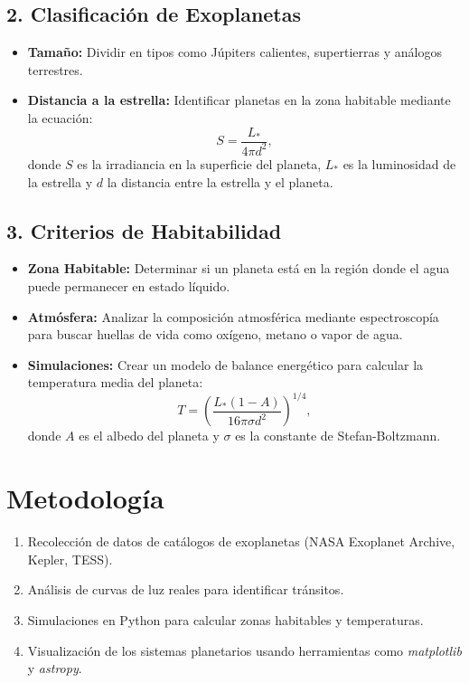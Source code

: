 \documentclass[12pt]{article}
\begin{document}
\subsection*{2. Clasificaci\'on de Exoplanetas}
\begin{itemize}
    \item \textbf{Tama\~no:} Dividir en tipos como J\'upiters calientes, supertierras y an\'alogos terrestres.
    \item \textbf{Distancia a la estrella:} Identificar planetas en la zona habitable mediante la ecuaci\'on:
    \begin{equation}
        S = \frac{L_*}{4 \pi d^2},
    \end{equation}
    donde $S$ es la irradiancia en la superficie del planeta, $L_*$ es la luminosidad de la estrella y $d$ la distancia entre la estrella y el planeta.
\end{itemize}

\subsection*{3. Criterios de Habitabilidad}
\begin{itemize}
    \item \textbf{Zona Habitable:} Determinar si un planeta est\'a en la regi\'on donde el agua puede permanecer en estado l\'iquido.
    \item \textbf{Atm\'osfera:} Analizar la composici\'on atmosf\'erica mediante espectroscop\'ia para buscar huellas de vida como ox\'igeno, metano o vapor de agua.
    \item \textbf{Simulaciones:} Crear un modelo de balance energ\'etico para calcular la temperatura media del planeta:
    \begin{equation}
        T = \left(\frac{L_*(1-A)}{16 \pi \sigma d^2}\right)^{1/4},
    \end{equation}
    donde $A$ es el albedo del planeta y $\sigma$ es la constante de Stefan-Boltzmann.
\end{itemize}

\section*{Metodolog\'ia}
\begin{enumerate}
    \item Recolecci\'on de datos de cat\'alogos de exoplanetas (NASA Exoplanet Archive, Kepler, TESS).
    \item An\'alisis de curvas de luz reales para identificar tr\'ansitos.
    \item Simulaciones en Python para calcular zonas habitables y temperaturas.
    \item Visualizaci\'on de los sistemas planetarios usando herramientas como \textit{matplotlib} y \textit{astropy}.
\end{enumerate}
\end{document}
